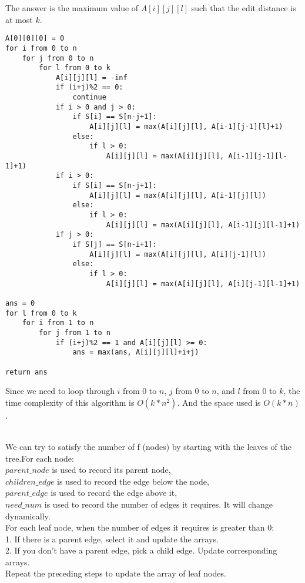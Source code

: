 \documentclass[12pt,a4paper]{article}
\newcommand{\question}[1]{\bigskip\noindent{\textbf{Q{#1} solution}}}
\begin{document}
The answer is the maximum value of $A[i][j][l]$ such that the edit distance is at most $k$. 
\begin{lstlisting}
A[0][0][0] = 0
for i from 0 to n
    for j from 0 to n
        for l from 0 to k
            A[i][j][l] = -inf
            if (i+j)%2 == 0:
                continue
            if i > 0 and j > 0:
                if S[i] == S[n-j+1]:
                    A[i][j][l] = max(A[i][j][l], A[i-1][j-1][l]+1)
                else:
                    if l > 0:
                        A[i][j][l] = max(A[i][j][l], A[i-1][j-1][l-1]+1)
            if i > 0:
                if S[i] == S[n-j+1]:
                    A[i][j][l] = max(A[i][j][l], A[i-1][j][l])
                else:
                    if l > 0:
                        A[i][j][l] = max(A[i][j][l], A[i-1][j][l-1]+1)
            if j > 0:
                if S[j] == S[n-i+1]:
                    A[i][j][l] = max(A[i][j][l], A[i][j-1][l])
                else:
                    if l > 0:
                        A[i][j][l] = max(A[i][j][l], A[i][j-1][l-1]+1)
                    
ans = 0
for l from 0 to k
    for i from 1 to n
        for j from 1 to n
            if (i+j)%2 == 1 and A[i][j][l] >= 0:
                ans = max(ans, A[i][j][l]+i+j)
                
return ans
\end{lstlisting}
Since we need to loop through $i$ from 0 to $n$, $j$ from 0 to $n$, and $l$ from 0 to $k$, the time complexity of this algorithm is $O(k*n^2)$. And the space used is $O(k*n)$.

\question{20}
\\We can try to satisfy the number of f (nodes) by starting with the leaves of the tree.For each node:
\\$parent\_node$ is used to record its parent node, 
\\$children\_edge$ is used to record the edge below the node, 
\\$parent\_edge$ is used to record the edge above it, 
\\$need\_num$ is used to record the number of edges it requires. It will change dynamically.\\


\noindent
For each leaf node, when the number of edges it requires is greater than 0:
\\1. If there is a parent edge, select it and update the arrays.
\\2. If you don't have a parent edge, pick a child edge. Update corresponding arrays.
\\Repeat the preceding steps to update the array of leaf nodes.
\end{document}
